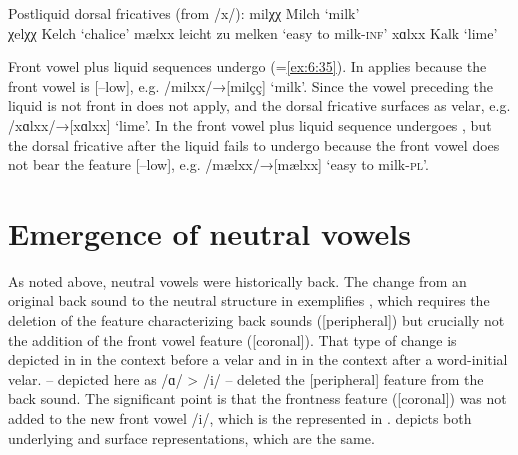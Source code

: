 \ea%
\label{ex:6:52}Postliquid dorsal fricatives (from /x/):
\ea\label{ex:6:52a}  milχχ \tab [milçç] \tab Milch            \tab ‘milk’          \\
     χelχχ \tab [çelçç] \tab Kelch            \tab ‘chalice’       
\ex\label{ex:6:52b}  mælxx \tab [mælxx] \tab leicht zu melken \tab ‘easy to milk-\textsc{inf}’  
\ex\label{ex:6:52c}  xɑlxx \tab [xɑlxx] \tab Kalk             \tab ‘lime’          
\z 
\z 


Front vowel plus liquid sequences undergo  (=\ref{ex:6:35}). In   applies because the front vowel is [--low], e.g. /milxx/→[milçç] ‘milk’. Since the vowel preceding the liquid is not front in   does not apply, and the dorsal fricative surfaces as velar, e.g. /xɑlxx/→[xɑlxx] ‘lime’. In  the front vowel plus liquid sequence undergoes , but the dorsal fricative after the liquid fails to undergo  because the front vowel does not bear the feature [--low], e.g. /mælxx/→[mælxx] ‘easy to milk-\textsc{pl}’.

\section{{Emergence} {of} {neutral} {vowels}}\label{sec:6.4}

As noted above, neutral vowels were historically back. The change from an original back sound to the neutral structure in  exemplifies , which requires the deletion of the feature characterizing back sounds ([peripheral]) but crucially not the addition of the front vowel feature ([coronal]). That type of change is depicted in  in the context before a velar and in  in the context after a word-initial velar.  – depicted here as /ɑ/ > /i/ – deleted the [peripheral] feature from the back sound. The significant point is that the frontness feature ([coronal]) was not added to the new front vowel /i/, which is the  represented in .  depicts both underlying and surface representations, which are the same.

